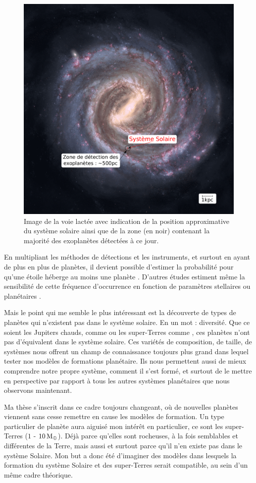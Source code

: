 \begin{figure}[htb]
\centering
\includegraphics[width=0.45\linewidth]{figure/milky_way_exoplanets.pdf}
\caption{Image de la voie lactée avec indication de la position approximative du système solaire ainsi que de la zone (en noir) contenant la majorité des exoplanètes détectées à ce jour.}\label{fig:milky_way_exoplanet}
\end{figure}


En multipliant les méthodes de détections et les instruments, et surtout en ayant de plus en plus de planètes, il devient possible d'estimer la probabilité pour qu'une étoile héberge au moins une planète \citep{mayor2011road}. D'autres études estiment même la sensibilité de cette fréquence d'occurrence en fonction de paramètres stellaires \citep{fischer2005planet, johnson2007new, howard2012occurrence} ou planétaires \citep{mayor2011road, howard2010occurrence}. 

Mais le point qui me semble le plus intéressant est la découverte de types de planètes qui n'existent pas dans le système solaire. En un mot : diversité. Que ce soient les Jupiters chauds, comme  ou les super-Terres comme , ces planètes n'ont pas d'équivalent dans le système solaire. Ces variétés de composition, de taille, de systèmes nous offrent un champ de connaissance toujours plus grand dans lequel tester nos modèles de formations planétaire. Ils nous permettent aussi de mieux comprendre notre propre système, comment il s'est formé, et surtout de le mettre en perspective par rapport à tous les autres systèmes planétaires que nous observons maintenant.

Ma thèse s'inscrit dans ce cadre toujours changeant, où de nouvelles planètes viennent sans cesse remettre en cause les modèles de formation. Un type particulier de planète aura aiguisé mon intérêt en particulier, ce sont les super-Terres ($1$ - $10\mathrm{\thinspace M_\oplus}$). Déjà parce qu'elles sont rocheuses, à la fois semblables et différentes de la Terre, mais aussi et surtout parce qu'il n'en existe pas dans le système Solaire. Mon but a donc été d'imaginer des modèles dans lesquels la formation du système Solaire et des super-Terres serait compatible, au sein d'un même cadre théorique.

